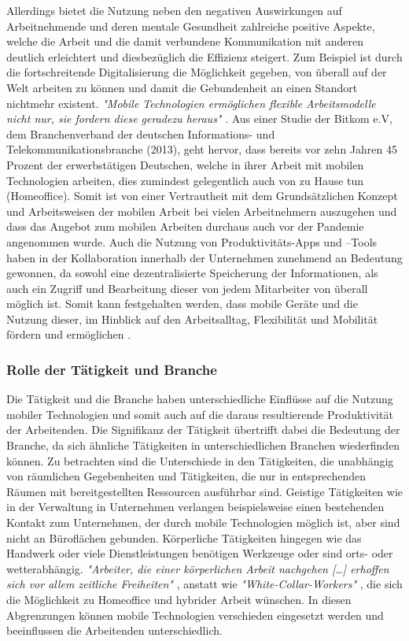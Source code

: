 \documentclass[12pt,a4paper]{article}
\begin{document}
Allerdings bietet die Nutzung neben den negativen Auswirkungen auf Arbeitnehmende und deren mentale Gesundheit zahlreiche positive Aspekte, welche die Arbeit und die damit verbundene Kommunikation mit anderen deutlich erleichtert und diesbezüglich die Effizienz steigert.
Zum Beispiel ist durch die fortschreitende Digitalisierung die Möglichkeit gegeben, von überall auf der Welt arbeiten zu können und damit die Gebundenheit an einen Standort nichtmehr existent. 
\emph{"Mobile Technologien ermöglichen flexible Arbeitsmodelle nicht nur, sie fordern diese geradezu heraus"} \parencite[Stephan Pfisterer, S.9,][]{arbeit30}.
Aus einer Studie der Bitkom e.V, dem Branchenverband der deutschen Informations- und Telekommunikationsbranche (2013), geht hervor, dass bereits vor zehn Jahren 45 Prozent der erwerbstätigen Deutschen, welche in ihrer Arbeit mit mobilen Technologien arbeiten, dies zumindest gelegentlich auch von zu Hause tun (Homeoffice). Somit ist von einer Vertrautheit mit dem Grundsätzlichen Konzept und Arbeitsweisen der mobilen Arbeit bei vielen Arbeitnehmern auszugehen und dass das Angebot zum mobilen Arbeiten durchaus auch vor der Pandemie angenommen wurde.
Auch die Nutzung von Produktivitäts-Apps und –Tools haben in der Kollaboration innerhalb der Unternehmen zunehmend an Bedeutung gewonnen, da sowohl eine dezentralisierte Speicherung der Informationen, als auch ein Zugriff und Bearbeitung dieser von jedem Mitarbeiter von überall möglich ist.
Somit kann festgehalten werden, dass mobile Geräte und die Nutzung dieser, im Hinblick auf den Arbeitsalltag, Flexibilität und Mobilität fördern und ermöglichen \parencite[vgl.][]{arbeit30}. 
 
\subsubsection*{Rolle der Tätigkeit und Branche}
Die Tätigkeit und die Branche haben unterschiedliche Einflüsse auf die Nutzung mobiler Technologien und somit auch auf die daraus resultierende Produktivität der Arbeitenden. 
Die Signifikanz der Tätigkeit übertrifft dabei die Bedeutung der Branche, da sich ähnliche Tätigkeiten in unterschiedlichen Branchen wiederfinden können. 
Zu betrachten sind die Unterschiede in den Tätigkeiten, die unabhängig von räumlichen Gegebenheiten und Tätigkeiten, die nur in entsprechenden Räumen mit bereitgestellten Ressourcen ausführbar sind. 
Geistige Tätigkeiten wie in der Verwaltung in Unternehmen verlangen beispielsweise einen bestehenden Kontakt zum Unternehmen, der durch mobile Technologien möglich ist, aber sind nicht an Büroflächen gebunden. 
Körperliche Tätigkeiten hingegen wie das Handwerk oder viele Dienstleistungen benötigen Werkzeuge oder sind orts- oder wetterabhängig.
\emph{"Arbeiter, die einer körperlichen Arbeit nachgehen […] erhoffen sich vor allem zeitliche Freiheiten"} \parencite{frenz1963definition}, anstatt wie \emph{"White-Collar-Workers"} \parencite{frenz1963definition}, die sich die Möglichkeit zu Homeoffice und hybrider Arbeit wünschen. 
In diesen Abgrenzungen können mobile Technologien verschieden eingesetzt werden und beeinflussen die Arbeitenden unterschiedlich. 
\end{document}
